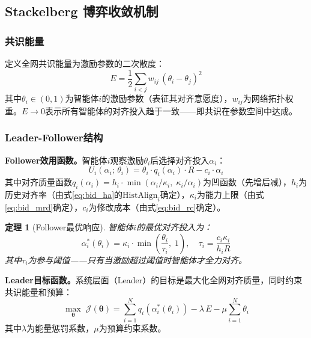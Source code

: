 \documentclass[12pt,a4paper,UTF8,fontset=fandol]{ctexart}
\newtheorem{theorem}{定理}[section]
\begin{document}
\subsection{Stackelberg 博弈收敛机制}\label{sec:stackelberg}

\subsubsection{共识能量}

定义全网共识能量为激励参数的二次散度：
\begin{equation}\label{eq:energy}
E = \frac{1}{2} \sum_{i<j} w_{ij}\,(\theta_i - \theta_j)^2
\end{equation}
其中$\theta_i \in (0,1)$为智能体$i$的激励参数（表征其对齐意愿度），$w_{ij}$为网络拓扑权重。$E \to 0$表示所有智能体的对齐投入趋于一致——即共识在参数空间中达成。

\subsubsection{Leader-Follower结构}

\textbf{Follower效用函数。}智能体$i$观察激励$\theta_i$后选择对齐投入$\alpha_i$：
\begin{equation}
U_i(\alpha_i;\, \theta_i) = \theta_i \cdot q_i(\alpha_i) \cdot R - c_i \cdot \alpha_i
\end{equation}
其中对齐质量函数$q_i(\alpha_i) = h_i \cdot \min(\alpha_i / \kappa_i,\; \kappa_i / \alpha_i)$为凹函数（先增后减），$h_i$为历史对齐率（由式\eqref{eq:bid_ha}的$\text{HistAlign}_i$确定），$\kappa_i$为能力上限（由式\eqref{eq:bid_mrd}确定），$c_i$为修改成本（由式\eqref{eq:bid_rc}确定）。

\begin{theorem}[Follower最优响应]\label{thm:follower}
智能体$i$的最优对齐投入为：
\begin{equation}
\alpha_i^*(\theta_i) = \kappa_i \cdot \min\!\left(\frac{\theta_i}{\tau_i},\; 1\right), \quad \tau_i = \frac{c_i \kappa_i}{h_i R}
\end{equation}
其中$\tau_i$为参与阈值——只有当激励超过阈值时智能体才全力对齐。
\end{theorem}

\textbf{Leader目标函数。}系统层面（Leader）的目标是最大化全网对齐质量，同时约束共识能量和预算：
\begin{equation}\label{eq:leader}
\max_{\boldsymbol\theta}\; \mathcal{J}(\boldsymbol\theta) = \sum_{i=1}^N q_i(\alpha_i^*(\theta_i)) - \lambda\,E - \mu \sum_{i=1}^N \theta_i
\end{equation}
其中$\lambda$为能量惩罚系数，$\mu$为预算约束系数。
\end{document}
